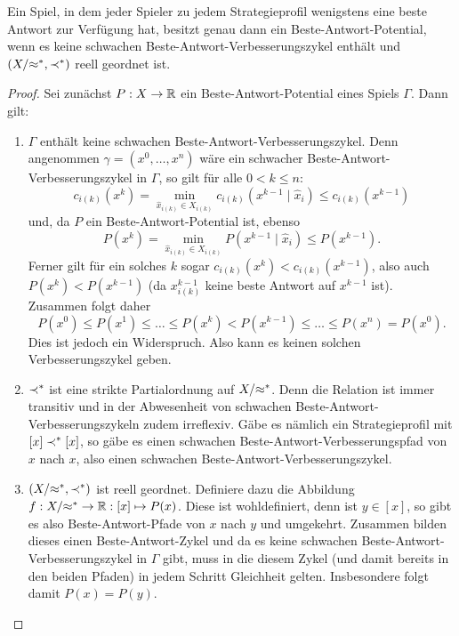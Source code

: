 \begin{satz}\label{satz:CharExBAPot}
	Ein Spiel, in dem jeder Spieler zu jedem Strategieprofil wenigstens eine beste Antwort zur Verfügung hat, besitzt genau dann ein Beste-Antwort-Potential, wenn es keine schwachen Beste-Antwort-Verbesserungszykel enthält und $(X/{\approx^\ast}, \prec^\ast)$ reell geordnet ist.
\end{satz}

\begin{proof}
	Sei zunächst $P: X \to \mathbb{R}$ ein Beste-Antwort-Potential eines Spiels $\Gamma$. Dann gilt:
	\begin{enumerate}
		\item $\Gamma$ enthält keine schwachen Beste-Antwort-Verbesserungszykel. Denn angenommen $\gamma = (x^0, \dots, x^n)$ wäre ein schwacher Beste-Antwort-Verbesserungszykel in $\Gamma$, so gilt für alle $0 < k \leq n$:
			\[c_{i(k)}(x^k) = \min_{\hat{x}_{i(k)} \in X_{i(k)}} c_{i(k)}(x^{k-1} \mid \hat{x}_i) \leq c_{i(k)}(x^{k-1})\]
		und, da $P$ ein Beste-Antwort-Potential ist, ebenso 
			\[P(x^k) = \min_{\hat{x}_{i(k)} \in X_{i(k)}} P(x^{k-1} \mid \hat{x}_i) \leq P(x^{k-1}).\]
		Ferner gilt für ein solches $k$ sogar $c_{i(k)}(x^k) < c_{i(k)}(x^{k-1})$, also auch $P(x^k) < P(x^{k-1})$ (da $x^{k-1}_{i(k)}$ keine beste Antwort auf $x^{k-1}$ ist). Zusammen folgt daher
			\[P(x^0) \leq P(x^1) \leq \dots \leq P(x^k) < P(x^{k-1}) \leq \dots \leq P(x^n) = P(x^0).\]
		Dies ist jedoch ein Widerspruch. Also kann es keinen solchen Verbesserungszykel geben.
		
		\item $\prec^\ast$ ist eine strikte Partialordnung auf $X/{\approx^\ast}$. Denn die Relation ist immer transitiv und in der Abwesenheit von schwachen Beste-Antwort-Verbesserungszykeln zudem irreflexiv. Gäbe es nämlich ein Strategieprofil mit $[x] \prec^\ast [x]$, so gäbe es einen schwachen Beste-Antwort-Verbesserungspfad von $x$ nach $x$, also einen schwachen Beste-Antwort-Verbesserungszykel.
		
		\item $(X/{\approx^\ast}, \prec^\ast)$ ist reell geordnet. Definiere dazu die Abbildung $f: X/{\approx^\ast} \to \mathbb{R}: [x] \mapsto P(x)$. Diese ist wohldefiniert, denn ist $y \in [x]$, so gibt es also Beste-Antwort-Pfade von $x$ nach $y$ und umgekehrt. Zusammen bilden dieses einen Beste-Antwort-Zykel und da es keine schwachen Beste-Antwort-Verbesserungszykel in $\Gamma$ gibt, muss in die diesem Zykel (und damit bereits in den beiden Pfaden) in jedem Schritt Gleichheit gelten. Insbesondere folgt damit $P(x) = P(y)$.
		

\end{enumerate}
\end{proof}
